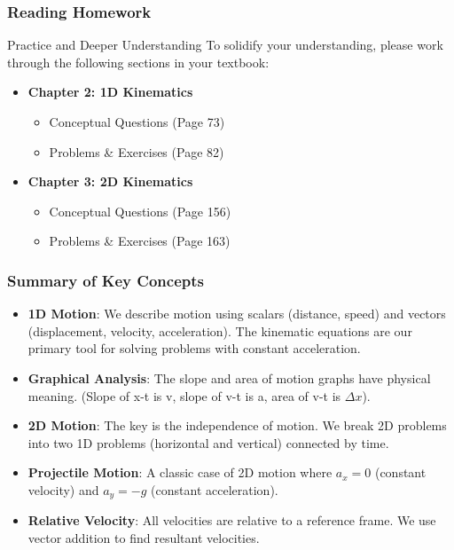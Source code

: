 \documentclass{beamer}
\begin{document}
\begin{frame}
\frametitle{Reading Homework}
\begin{block}{Practice and Deeper Understanding}
To solidify your understanding, please work through the following sections in your textbook:
\end{block}
\begin{itemize}
    \item \textbf{Chapter 2: 1D Kinematics}
    \begin{itemize}
        \item Conceptual Questions (Page 73)
        \item Problems \& Exercises (Page 82)
    \end{itemize}
    \vfill
    \item \textbf{Chapter 3: 2D Kinematics}
    \begin{itemize}
        \item Conceptual Questions (Page 156)
        \item Problems \& Exercises (Page 163)
    \end{itemize}
\end{itemize}
\end{frame}

\begin{frame}
\frametitle{Summary of Key Concepts}
\begin{itemize}
    \item \textbf{1D Motion}: We describe motion using scalars (distance, speed) and vectors (displacement, velocity, acceleration). The kinematic equations are our primary tool for solving problems with \alert{constant acceleration}.
    \vfill
    \item \textbf{Graphical Analysis}: The slope and area of motion graphs have physical meaning. (Slope of x-t is v, slope of v-t is a, area of v-t is $\Delta x$).
    \vfill
    \item \textbf{2D Motion}: The key is the \alert{independence of motion}. We break 2D problems into two 1D problems (horizontal and vertical) connected by time.
    \vfill
    \item \textbf{Projectile Motion}: A classic case of 2D motion where $a_x = 0$ (constant velocity) and $a_y = -g$ (constant acceleration).
    \vfill
    \item \textbf{Relative Velocity}: All velocities are relative to a reference frame. We use vector addition to find resultant velocities.
\end{itemize}
\end{frame}
\end{document}
